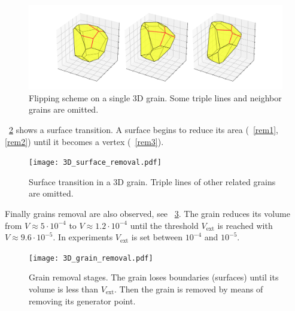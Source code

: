 \begin{figure}[!t]
    \centering
    \includegraphics[trim={0 2em 0 2em},scale=0.37]{figures/3D_flipping.pdf}
    \subfloat[\label{flip1}]{\hspace{.2\linewidth}}
    \subfloat[\label{flip2}]{\hspace{.2\linewidth}}
    \subfloat[\label{flip3}]{\hspace{.2\linewidth}}
    \caption[Flipping scheme on a single 3D grain.]{Flipping scheme on a single 3D grain. 
    Some triple lines and neighbor grains are omitted.}
    \label{fig:3Dflipping}
\end{figure}


\figurename~\ref{fig:3Dfaceremoval} shows a surface
transition. A surface begins to reduce its area (\figurename~\ref{rem1}, \ref{rem2}) until it becomes a vertex (\figurename~\ref{rem3}).

\begin{figure}[!t]
    \centering
    \texttt{[image: 3D\_surface\_removal.pdf]}
    \subfloat[\label{rem1}]{\hspace{.2\linewidth}}
    \subfloat[\label{rem2}]{\hspace{.2\linewidth}}
    \subfloat[\label{rem3}]{\hspace{.2\linewidth}}
    \caption[Surface transition in a 3D grain]{Surface transition in a 3D grain. Triple lines of other related grains are omitted.}
    \label{fig:3Dfaceremoval}
\end{figure}

Finally grains removal are also observed, 
see \figurename~\ref{fig:3Dremoval}. 
The grain reduces its volume from 
$V\approx 5\cdot10^{-4}$ to $V \approx 1.2\cdot10^{-4}$ until the threshold $V_{\text{ext}}$ is reached with $V \approx 9.6\cdot10^{-5}$. 
In experiments $V_{\text{ext}}$ is set between $10^{-4}$ and $10^{-5}$.

\begin{figure}[!t]
    \centering
    \texttt{[image: 3D\_grain\_removal.pdf]}
    \subfloat[\label{grem1}]{\hspace{.2\linewidth}}
    \subfloat[\label{grem2}]{\hspace{.2\linewidth}}
    \subfloat[\label{grem3}]{\hspace{.2\linewidth}}
    \caption{Grain removal stages. 
    The grain loses boundaries (surfaces) until its
    volume is less than $V_{\text{ext}}$.
    Then the grain is removed by means of 
    removing its generator point.}
    \label{fig:3Dremoval}
\end{figure}
